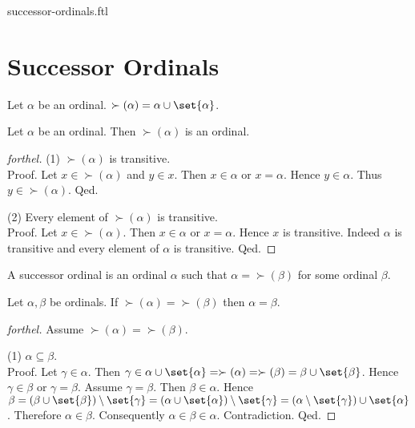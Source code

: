 \documentclass{naproche-library}
\begin{document}
\begin{smodule}{successor-ordinals.ftl}


  \section*{Successor Ordinals}

  \begin{definition}[forthel,id=SET_THEORY_02_8166925802668032]
    Let $\alpha$ be an ordinal.
    $\succ(\alpha) = \alpha \cup \set{\alpha}$.
  \end{definition}

  \begin{proposition}[forthel,id=SET_THEORY_02_1624410224066560]
    Let $\alpha$ be an ordinal.
    Then $\succ(\alpha)$ is an ordinal.
  \end{proposition}
  \begin{proof}[forthel]
    (1) $\succ(\alpha)$ is transitive. \\
    Proof.
      Let $x \in \succ(\alpha)$ and $y \in x$.
      Then $x \in \alpha$ or $x = \alpha$.
      Hence $y \in \alpha$.
      Thus $y \in \succ(\alpha)$.
    Qed.

    (2) Every element of $\succ(\alpha)$ is transitive. \\
    Proof.
      Let $x \in \succ(\alpha)$.
      Then $x \in \alpha$ or $x = \alpha$.
      Hence $x$ is transitive.
      Indeed $\alpha$ is transitive and every element of $\alpha$ is transitive.
    Qed.
  \end{proof}

  \begin{definition}[forthel,id=SET_THEORY_02_7129712109289472]
    A successor ordinal is an ordinal $\alpha$ such that $\alpha = \succ(\beta)$ for some ordinal $\beta$.
  \end{definition}

  \begin{proposition}[forthel,id=SET_THEORY_02_8651096763400192]
    Let $\alpha, \beta$ be ordinals.
    If $\succ(\alpha) = \succ(\beta)$ then $\alpha = \beta$.
  \end{proposition}
  \begin{proof}[forthel]
    Assume $\succ(\alpha) = \succ(\beta)$.

    (1) $\alpha \subseteq \beta$. \\
    Proof.
      Let $\gamma \in \alpha$.
      Then $\gamma \in \alpha \cup \set{\alpha}
        = \succ(\alpha)
        = \succ(\beta)
        = \beta \cup \set{\beta}$.
      Hence $\gamma \in \beta$ or $\gamma = \beta$.
      Assume $\gamma = \beta$.
      Then $\beta \in \alpha$.
      Hence $\beta
        = (\beta \cup \set{\beta}) \setminus \set{\gamma}
        = (\alpha \cup \set{\alpha}) \setminus \set{\gamma}
        = (\alpha \setminus \set{\gamma}) \cup \set{\alpha}$.
      Therefore $\alpha \in \beta$.
      Consequently $\alpha \in \beta \in \alpha$.
      Contradiction.
    Qed.


\end{proof}
\end{smodule}
\end{document}
